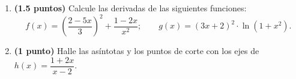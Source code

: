 
\begin{enumerate}[label=\alph*)]
\item \textbf{(1.5 puntos)} Calcule las derivadas de las siguientes funciones:
\[
f(x)=\left(\frac{2-5x}{3}\right)^2+\frac{1-2x}{x^2};\qquad g(x)=(3x+2)^2\cdot\ln(1+x^2).
\]
\item \textbf{(1 punto)} Halle las asíntotas y los puntos de corte con los ejes de $h(x)=\dfrac{1+2x}{x-2}$.
\end{enumerate}
